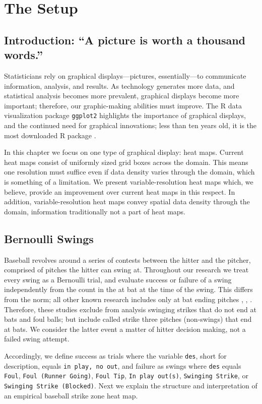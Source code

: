 \section{The Setup}
\subsection{Introduction: ``A picture is worth a thousand words.''}

Statisticians rely on graphical displays---pictures, essentially---to communicate information, analysis, and results. As technology generates more data, and statistical analysis becomes more prevalent, graphical displays become more important; therefore, our graphic-making abilities must improve. The R data visualization package \verb|ggplot2| highlights the importance of graphical displays, and the continued need for graphical innovations; less than ten years old, it is the most downloaded R package \citep{rdoc}.

In this chapter we focus on one type of graphical display: heat maps. Current heat maps consist of uniformly sized grid boxes across the domain. This means one resolution must suffice even if data density varies through the domain, which is something of a limitation. We present variable-resolution heat maps which, we believe, provide an improvement over current heat maps in this respect. In addition, variable-resolution heat maps convey spatial data density through the domain, information traditionally not a part of heat maps.

\subsection{Bernoulli Swings}

Baseball revolves around a series of contests between the hitter and the pitcher, comprised of pitches the hitter can swing at. Throughout our research we treat every swing as a Bernoulli trial, and evaluate success or failure of a swing independently from the count in the at bat at the time of the swing. This differs from the norm; all other known research includes only at bat ending pitches \citep{Cross2015}, \citep{Baumer2010}, \citep{Fast2011}. Therefore, these studies exclude from analysis swinging strikes that do not end at bats and foul balls; but include called strike three pitches (non-swings) that end at bats. We consider the latter event a matter of hitter decision making, not a failed swing attempt.  

Accordingly, we define success as trials where the variable \verb|des|, short for description, equals \verb|in play, no out|, and failure as swings where \verb|des| equals \verb|Foul|, \verb|Foul (Runner Going)|, \verb|Foul Tip|, \verb|In play out(s)|, \verb|Swinging Strike|, or \\ \verb|Swinging Strike (Blocked)|. Next we explain the structure and interpretation of an empirical baseball strike zone heat map.

